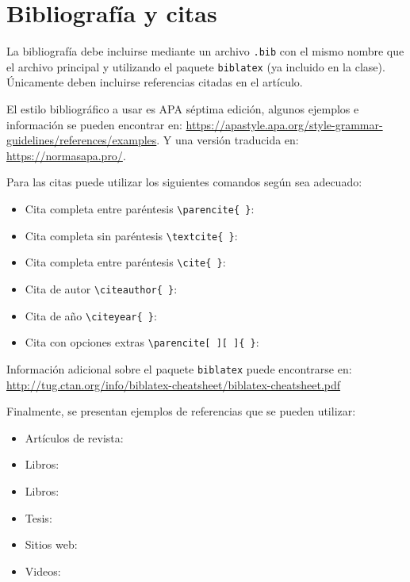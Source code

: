 \documentclass{aleph-revista}
\begin{document}
\section{Bibliografía y citas}

La bibliografía debe incluirse mediante un archivo \texttt{.bib} con el mismo nombre que el archivo principal y utilizando el paquete \texttt{biblatex} (ya incluido en la clase). Únicamente deben incluirse referencias citadas en el artículo.

El estilo bibliográfico a usar es APA séptima edición, algunos ejemplos e información se pueden encontrar en: \url{https://apastyle.apa.org/style-grammar-guidelines/references/examples}. Y una versión traducida en: \url{https://normasapa.pro/}.

Para las citas puede utilizar los siguientes comandos según sea adecuado:
\begin{itemize}
\item 
    Cita completa entre paréntesis \verb"\parencite{ }": \parencite{Bib06}
\item
    Cita completa sin paréntesis \verb"\textcite{ }": \textcite{Bib06}
\item 
    Cita completa entre paréntesis \verb"\cite{ }": \cite{Bib06}
\item
    Cita de autor \verb"\citeauthor{ }": \citeauthor{Bib06}
\item
    Cita de año \verb"\citeyear{ }": \citeyear{Bib06}
\item 
    Cita con opciones extras \verb"\parencite[ ][ ]{ }": \parencite[ver][pág. 66]{Bib06}
\end{itemize}
Información adicional sobre el paquete \texttt{biblatex} puede encontrarse en: \url{http://tug.ctan.org/info/biblatex-cheatsheet/biblatex-cheatsheet.pdf}

Finalmente, se presentan ejemplos de referencias que se pueden utilizar:
\begin{itemize}
    \item Artículos de revista: \cite{Bib01}
    \item Libros: \cite{Bib02}
    \item Libros: \cite{Bib06}
    \item Tesis: \cite{Bib03}
    \item Sitios web: \cite{Bib04}
    \item Videos: \cite{Bib05}
\end{itemize}
\end{document}
